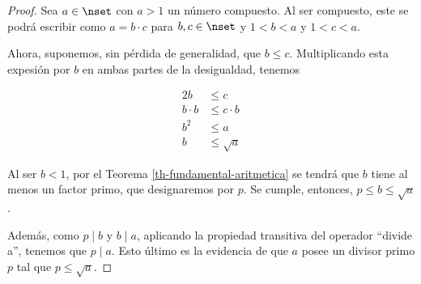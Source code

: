 \begin{proof}
  Sea $a \in \nset$ con $a > 1$ un número compuesto. Al ser compuesto, este
  se podrá escribir como $a = b \cdot c$ para $b, c \in \nset$ y $1 < b < a$
  y $1 < c < a$.

  Ahora, suponemos, sin pérdida de generalidad, que $b \leq c$.
  Multiplicando esta expesión por $b$ en ambas partes de la desigualdad,
  tenemos

  \begin{alignat*}{2}
    b           &\leq c \\
    b \cdot b   &\leq c \cdot b \\
    b^2         &\leq a \\
    b           &\leq \sqrt{a}
  \end{alignat*}

  Al ser $b < 1$, por el Teorema \ref{th-fundamental-aritmetica} se tendrá
  que $b$ tiene al menos un factor primo, que designaremos por $p$. Se
  cumple, entonces, $p \leq b \leq \sqrt{a}$.

  Además, como $p \mid b$ y $b \mid a$, aplicando la propiedad transitiva
  del operador ``divide a'', tenemos que $p \mid a$. Esto último es la
  evidencia de que $a$ posee un divisor primo $p$ tal que $p \leq \sqrt{a}$.

  \iffalse
  Suponemos que $a$ es un número natural positivo que además es compuesto.
  Entonces, por la definición de número compuesto, existen $b, c \in \zset$
  con $1 < b < a$ y $1 < c < a$ tales que $a = bc$.

  Suponemos, sin pérdida de generalidad, que $b \leq c$. Entonces,

  $$ b^2 \leq bc = a $$

  \noindent y, por tanto,

  \begin{alignat*}{2}
    \sqrt{b^2}  &\leq \sqrt{a}   \\
    |b|         &\leq \sqrt{a}   \\
    b           &\leq \sqrt{a}
  \end{alignat*}

  \noindent Aquí, $|b| = b$ porque $b > 1$, como hemos dicho.

  Si $b$ es primo, hemos llegado a una contradicción, ya que por hipótesis
  $a$ no es múltiplo de ningún primo $p \leq \sqrt{a}$.

  Si, por el contrario, $b$ es compuesto, entonces $b$ tiene factores
  primos. Sea $p$ uno de ellos. Entonces, $p < b$ y, así,

  $$ p < b \leq \sqrt{a} $$

  \noindent lo cual es otra contradicción.
  \fi
\end{proof}

